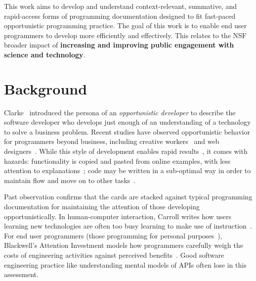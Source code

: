 \documentclass[12pt]{memoir}
\title{}
\author{Andrew Head}
\begin{document}


This work aims to develop and understand context-relevant, summative, and rapid-access forms of programming documentation designed to fit fast-paced opportunistic programming practice.
The goal of this work is to enable end user programmers to develop more efficiently and effectively.
This relates to the NSF broader impact of \textbf{increasing and improving public engagement with science and technology}.

\section{Background}

Clarke~\cite{clarke_what_2007} introduced the persona of an \emph{opportunistic developer} to describe the software developer who develops just enough of an understanding of a technology to solve a business problem.
Recent studies have observed opportunistic behavior for programmers beyond business, including creative workers~\cite{brandt_opportunistic_2008} and web designers~\cite{dorn_learning_2010}.
While this style of development enables rapid results~\cite{brandt_opportunistic_2008}, it comes with hazards:
functionality is copied and pasted from online examples, with less attention to explanations~\cite{brandt_two_2009};
code may be written in a sub-optimal way in order to maintain flow and move on to other tasks~\cite{brandt_opportunistic_2008}.

Past observation confirms that the cards are stacked against typical programming documentation for maintaining the attention of those developing opportunistically.
In human-computer interaction, Carroll writes how users learning new technologies are often too busy learning to make use of instruction~\cite{carroll_nurnberg_1990}.
For end user programmers (those programming for personal purposes~\cite{ko_state_2011}), Blackwell's Attention Investment models how programmers carefully weigh the costs of engineering activities against perceived benefits~\cite{blackwell_psychological_2006}.
Good software engineering practice like understanding mental models of APIs often lose in this assessment.
\end{document}
